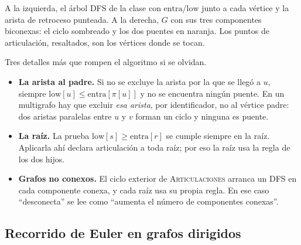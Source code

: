 \documentclass[11pt,letterpaper]{article}
\begin{document}
\begin{ejemplo}
\begin{center}
  \end{center}
  A la izquierda, el árbol DFS de la clase con
  $\text{entra}/\text{low}$ junto a cada vértice y la arista de
  retroceso punteada. A la derecha, $G$ con sus tres componentes
  biconexas: el ciclo sombreado y los dos puentes en naranja. Los
  puntos de articulación, resaltados, son los vértices donde se tocan.
\end{ejemplo}

\begin{ojo}
  Tres detalles más que rompen el algoritmo si se olvidan.
  \begin{itemize}[itemsep=0.1em]
    \item \textbf{La arista al padre.} Si no se excluye la arista por
          la que se llegó a $u$, siempre
          $\text{low}[u] \le \text{entra}[\pi[u]]$ y no se encuentra
          ningún puente. En un multigrafo hay que excluir \emph{esa
          arista}, por identificador, no al vértice padre: dos aristas
          paralelas entre $u$ y $v$ forman un ciclo y ninguna es
          puente.
    \item \textbf{La raíz.} La prueba $\text{low}[s] \ge
          \text{entra}[r]$ se cumple siempre en la raíz. Aplicarla ahí
          declara articulación a toda raíz; por eso la raíz usa la
          regla de los dos hijos.
    \item \textbf{Grafos no conexos.} El ciclo exterior de
          \textsc{Articulaciones} arranca un DFS en cada componente
          conexa, y cada raíz usa su propia regla. En ese caso
          ``desconecta'' se lee como ``aumenta el número de componentes
          conexas''.
  \end{itemize}
\end{ojo}


\subsection*{Recorrido de Euler en grafos dirigidos}
\end{document}
